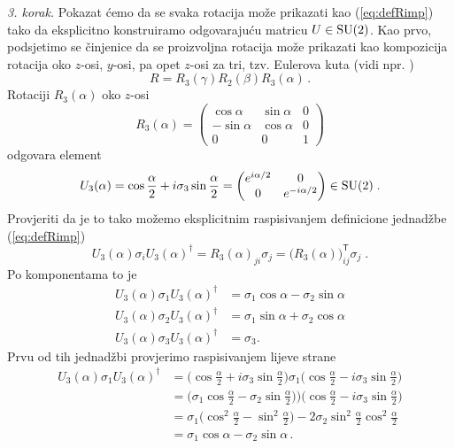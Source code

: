 \emph{3. korak.} 
Pokazat ćemo da se svaka rotacija može prikazati kao (\ref{eq:defRimp}) 
tako da eksplicitno konstruiramo odgovarajuću matricu $U \in \mathrm{SU}(2)$.
Kao prvo, podsjetimo se činjenice da se proizvoljna rotacija može prikazati
kao kompozicija rotacija oko $z$-osi, $y$-osi, pa opet $z$-osi za tri,
tzv. Eulerova kuta (vidi npr. \cite{Sakurai:2011})
\begin{equation}
R = R_{3}(\gamma) R_{2}(\beta) R_{3}(\alpha) \,.
\end{equation}
Rotaciji $R_{3}(\alpha)$  oko $z$-osi
\begin{equation}
   R_{3}(\alpha) = 
   \begin{pmatrix}
       \cos\alpha & \sin\alpha & 0 \\
      -\sin\alpha & \cos\alpha & 0 \\
       0 & 0 & 1
   \end{pmatrix}
\end{equation}
odgovara element
\begin{equation}
    U_{3}(\alpha) =   \cos\frac{\alpha}{2} + i \sigma_{3} \sin\frac{\alpha}{2} =
    \begin{pmatrix}
        e^{i\alpha/2} & 0 \\
        0 & e^{-i\alpha/2}
    \end{pmatrix} \in \mathrm{SU}(2) \;.
\end{equation}
Provjeriti da je to tako možemo eksplicitnim raspisivanjem definicione
jednadžbe (\ref{eq:defRimp}) 
\begin{equation}
    U_{3}(\alpha) \sigma_i U_{3}(\alpha)^\dagger =
    R_{3}(\alpha)_{ji} \sigma_{j} = \big(R_{3}(\alpha)\big)^{\mathsf{T}}_{ij} \sigma_j \;.
\end{equation}
Po komponentama to je
\begin{align}
    U_{3}(\alpha) \sigma_1 U_{3}(\alpha)^\dagger& = \sigma_1 \cos\alpha - \sigma_2 \sin\alpha \\
    U_{3}(\alpha) \sigma_2 U_{3}(\alpha)^\dagger& = \sigma_1 \sin\alpha + \sigma_2 \cos\alpha \\
    U_{3}(\alpha) \sigma_3 U_{3}(\alpha)^\dagger& = \sigma_3
.\end{align}
Prvu od tih jednadžbi provjerimo raspisivanjem lijeve strane
\begin{align}
    U_{3}(\alpha) \sigma_1 U_{3}(\alpha)^\dagger & =
    \big(\cos\frac{\alpha}{2} + i \sigma_{3} \sin\frac{\alpha}{2}\big) \sigma_1
    \big(\cos\frac{\alpha}{2} - i \sigma_{3} \sin\frac{\alpha}{2}\big) \\
& =   \big(\sigma_1 \cos\frac{\alpha}{2} - \sigma_{2} \sin\frac{\alpha}{2})\big)
    \big(\cos\frac{\alpha}{2} - i \sigma_{3} \sin\frac{\alpha}{2}\big) \\
& =   \sigma_1 \big(\cos^{2}\frac{\alpha}{2} -  \sin^{2}\frac{\alpha}{2}\big)
  -   2 \sigma_2 \sin^{2}\frac{\alpha}{2}\cos^{2}\frac{\alpha}{2} \\
& =   \sigma_1 \cos\alpha -  \sigma_2 \sin\alpha \,.
\end{align}

